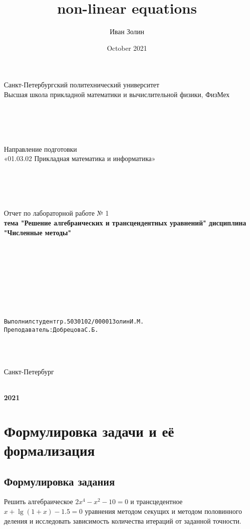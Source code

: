 \documentclass{article}
\title{non-linear equations}
\author{Иван Золин}
\date{October 2021}
\begin{document}
	
	\large
	\begin{center}
		
		Санкт-Петербургский политехнический университет\\
		Высшая школа прикладной математики и вычислительной физики, ФизМех
		
		~\\
		~\\
		~\\
		~\\
		Направление подготовки\\
		«01.03.02 Прикладная математика и информатика»
		
		~\\
		~\\
		~\\
		~\\
		Отчет по лабораторной работе № 1\\
		\textbf{тема "Решение алгебраических и трансцендентных уравнений"
			дисциплина "Численные методы"}
	\end{center}
	
	~\\
	~\\
	~\\
	~\\
	~\\
	~\\
	~\\
	\begin{alltt}
		Выполнил студент гр. 5030102/00001			  		   		  Золин И.М.
		Преподаватель: 				              	        	Добрецова С.Б.
	\end{alltt}
	
	~\\
	~\\
	\begin{center}
		Санкт-Петербург
		
		~\\
		\textbf{2021}
	\end{center}{}
	
	\newpage
	
	\section{Формулировка задачи и её формализация}
	\subsection{Формулировка задания}
	Решить алгебраическое $2x^4-x^2-10=0$ и трансцедентное $x + \lg{(1+x)}-1.5=0$ уравнения методом секущих и методом половинного деления и исследовать зависимость количества итераций от заданной точности.
	
\end{document}
